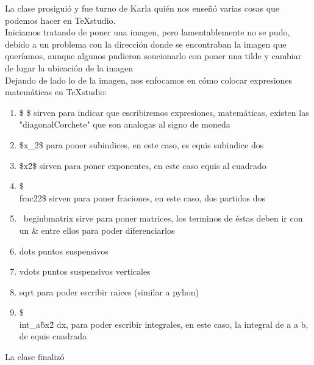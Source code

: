\documentclass{book}
\begin{document}
\begin{enumerate}
\begin{enumerate}
La clase prosiguió y fue turno de Karla quién nos enseñó varias cosas que podemos hacer en TeXstudio. \\
Iniciamos tratando de poner una imagen, pero lamentablemente no se pudo, debido a un problema con la dirección donde se encontraban la imagen que queríamos, aunque algunos pudieron soucionarlo con poner una tilde y cambiar de lugar la ubicación de la imagen\\
Dejando de lado lo de la imagen, nos enfocamos en cómo colocar expresiones matemáticas en TeXstudio:
\begin{enumerate}
	\item \$ \$ sirven para indicar que escribiremos expresiones, matemáticas, existen las "diagonalCorchete" que son analogas al signo de moneda
	\item \$x\_{2}\$ para poner subindices, en este caso, es equis subindice dos
	\item \$x\^{2}\$ sirven para poner exponentes, en este caso equis al cuadrado
	\item \$\\frac{2}{2}\$ sirven para poner fraciones, en este caso, dos partidos dos
	\item \ begin{bmatrix} sirve para poner matrices, los terminos de éstas deben ir con un \& entre ellos para poder diferenciarlos
	\item dots puntos suspensivos
	\item vdots puntos suspensivos  verticales
	\item sqrt para poder escribir raices (similar a pyhon)
	\item \$\\int\_{a}\^{b}x\^2 dx, para poder escribir integrales, en este caso, la integral de a a b, de equis cuadrada
	
	
\end{enumerate}
La clase finalizó


\end{enumerate}
\end{enumerate}
\end{document}
